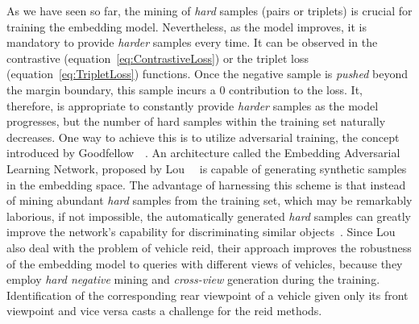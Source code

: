 As we have seen so far, the mining of \emph{hard} samples (pairs or triplets) is crucial for training the embedding model. Nevertheless, as the model improves, it is mandatory to provide \emph{harder} samples every time. It can be observed in the contrastive (equation~\ref{eq:ContrastiveLoss}) or the triplet loss (equation~\ref{eq:TripletLoss}) functions. Once the negative sample is \emph{pushed} beyond the margin boundary, this sample incurs a $0$ contribution to the loss. It, therefore, is appropriate to constantly provide \emph{harder} samples as the model progresses, but the number of hard samples within the training set naturally decreases. One way to achieve this is to utilize adversarial training, the concept introduced by Goodfellow~\etal{}~\cite{goodfellow2014gans}. An architecture called the Embedding Adversarial Learning Network, proposed by Lou~\etal{}~\cite{lou2019embreid} is capable of generating synthetic samples in the embedding space. The advantage of harnessing this scheme is that instead of mining abundant \emph{hard} samples from the training set, which may be remarkably laborious, if not impossible, the automatically generated \emph{hard} samples can greatly improve the network's capability for discriminating similar objects~\cite{lou2019embreid}. Since Lou~\etal{}~\cite{lou2019embreid} also deal with the problem of vehicle \gls{reid}, their approach improves the robustness of the embedding model to queries with different views of vehicles, because they employ \emph{hard negative} mining and \emph{cross-view} generation during the training. Identification of the corresponding rear viewpoint of a vehicle given only its front viewpoint and vice versa casts a challenge for the \gls{reid} methods.

